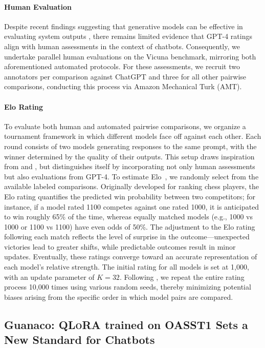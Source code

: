 \paragraph{Human Evaluation} Despite recent findings suggesting that generative models can be effective in evaluating system outputs \citep{fu2023gptscore}, there remains limited evidence that GPT-4 ratings align with human assessments in the context of chatbots. Consequently, we undertake parallel human evaluations on the Vicuna benchmark, mirroring both aforementioned automated protocols. For these assessments, we recruit two annotators per comparison against ChatGPT and three for all other pairwise comparisons, conducting this process via Amazon Mechanical Turk (AMT).

\paragraph{Elo Rating} To evaluate both human and automated pairwise comparisons, we organize a tournament framework in which different models face off against each other. Each round consists of two models generating responses to the same prompt, with the winner determined by the quality of their outputs. This setup draws inspiration from \citet{bai2022training} and \citet{vicuna2023}, but distinguishes itself by incorporating not only human assessments but also evaluations from GPT-4. To estimate Elo~\citep{elo1967proposed,elo1978rating}, we randomly select from the available labeled comparisons. Originally developed for ranking chess players, the Elo rating quantifies the predicted win probability between two competitors; for instance, if a model rated 1100 competes against one rated 1000, it is anticipated to win roughly 65\% of the time, whereas equally matched models (e.g., 1000 vs 1000 or 1100 vs 1100) have even odds of 50\%. The adjustment to the Elo rating following each match reflects the level of surprise in the outcome—unexpected victories lead to greater shifts, while predictable outcomes result in minor updates. Eventually, these ratings converge toward an accurate representation of each model's relative strength. The initial rating for all models is set at 1,000, with an update parameter of $K=32$. Following \citet{vicuna2023}, we repeat the entire rating process 10,000 times using various random seeds, thereby minimizing potential biases arising from the specific order in which model pairs are compared.

\subsection{\textbf{Guanaco}: \textsc{QLoRA} trained on OASST1 Sets a New Standard for Chatbots} 

